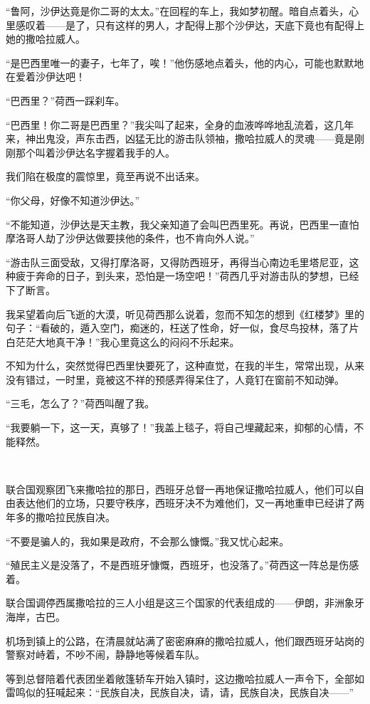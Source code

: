 \par “鲁阿，沙伊达竟是你二哥的太太。”在回程的车上，我如梦初醒。暗自点着头，心里感叹着——是了，只有这样的男人，才配得上那个沙伊达，天底下竟也有配得上她的撒哈拉威人。
\par “是巴西里唯一的妻子，七年了，唉！”他伤感地点着头，他的内心，可能也默默地在爱着沙伊达吧！
\par “巴西里？”荷西一踩刹车。
\par “巴西里！你二哥是巴西里？”我尖叫了起来，全身的血液哗哗地乱流着，这几年来，神出鬼没，声东击西，凶猛无比的游击队领袖，撒哈拉威人的灵魂——竟是刚刚那个叫着沙伊达名字握着我手的人。
\par 我们陷在极度的震惊里，竟至再说不出话来。
\par “你父母，好像不知道沙伊达。”
\par “不能知道，沙伊达是天主教，我父亲知道了会叫巴西里死。再说，巴西里一直怕摩洛哥人劫了沙伊达做要挟他的条件，也不肯向外人说。”
\par “游击队三面受敌，又得打摩洛哥，又得防西班牙，再得当心南边毛里塔尼亚，这种疲于奔命的日子，到头来，恐怕是一场空吧！”荷西几乎对游击队的梦想，已经下了断言。
\par 我呆望着向后飞逝的大漠，听见荷西那么说着，忽而不知怎的想到《红楼梦》里的句子：“看破的，遁入空门，痴迷的，枉送了性命，好一似，食尽鸟投林，落了片白茫茫大地真干净！”我心里竟这么的闷闷不乐起来。
\par 不知为什么，突然觉得巴西里快要死了，这种直觉，在我的半生，常常出现，从来没有错过，一时里，竟被这不祥的预感弄得呆住了，人竟钉在窗前不知动弹。
\par “三毛，怎么了？”荷西叫醒了我。
\par “我要躺一下，这一天，真够了！”我盖上毯子，将自己埋藏起来，抑郁的心情，不能释然。
\par  
\par 联合国观察团飞来撒哈拉的那日，西班牙总督一再地保证撒哈拉威人，他们可以自由表达他们的立场，只要守秩序，西班牙决不为难他们，又一再地重申已经讲了两年多的撒哈拉民族自决。
\par “不要是骗人的，我如果是政府，不会那么慷慨。”我又忧心起来。
\par “殖民主义是没落了，不是西班牙慷慨，西班牙，也没落了。”荷西这一阵总是伤感着。
\par 联合国调停西属撒哈拉的三人小组是这三个国家的代表组成的——伊朗，非洲象牙海岸，古巴。
\par 机场到镇上的公路，在清晨就站满了密密麻麻的撒哈拉威人，他们跟西班牙站岗的警察对峙着，不吵不闹，静静地等候着车队。
\par 等到总督陪着代表团坐着敞篷轿车开始入镇时，这边撒哈拉威人一声令下，全部如雷鸣似的狂喊起来：“民族自决，民族自决，请，请，民族自决，民族自决——”
